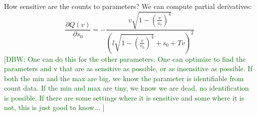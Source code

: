 \documentclass{article}
\newcommand{\kibitz}[2]{\ifnum\Comments=0\textcolor{#1}{#2}\fi}
\newcommand{\Dan}[1]{\kibitz{darkgreen}      {[DBW: #1]}}
\begin{document}
How sensitive are the counts to parameters? We can compute partial
derivatives: 
\begin{equation}
    \frac{\partial Q(v)}{\partial s_{0}}=-\frac{v\sqrt{1-\left(\frac{v}{v_{0}}\right)^{4}}}{\left(l\sqrt{1-\left(\frac{v}{v_{0}}\right)^{4}}+s_{0}+Tv\right)^{2}}
\end{equation}
\Dan{One can do this for the other parameters. One can optimize to find the parameters and v that are as sensitive as possible, or as insensitive as possible. If both the min and the max are big, we know the parameter is identifiable from count data. If the min and max are tiny, we know we are dead, no identification is possible. If there are some settings where it is sensitive and some where it is not, this is just good to know... }



\end{document}
